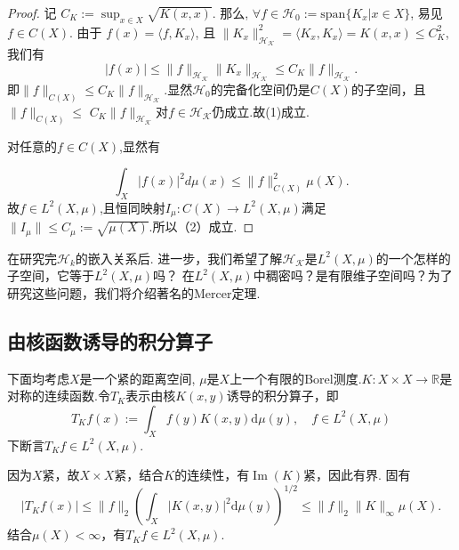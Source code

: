 \documentclass[12pt, a4paper, oneside]{ctexbook}
\begin{document}
\begin{proof}
    记 $C_K := \sup_{x \in X} \sqrt{K(x, x)}$. 那么, $\forall f \in \mathcal{H}_0 := \text{span}\{K_x | x \in X\}$, 易见 $f \in C(X)$. 由于 $f(x) = \langle f, K_x  \rangle$, 且 $\|K_x\|_{\mathcal{H_K}}^2 = \langle K_x, K_x \rangle = K(x, x) \leq C_K^2$, 我们有
$$|f(x)| \leq \|f\|_{\mathcal{H_K}} \|K_x\|_{\mathcal{H_K}} \leq C_K \|f\|_{\mathcal{H_K}}.$$
即$\|f\|_{C(X)}\leq C_K\|f\|_{\mathcal{H_K}}$.显然$\mathcal{H}_0$的完备化空间仍是$C(X)$的子空间，且$\|f\|_{C(X)}\leq$
$C_{K}\|f\|_{\mathcal{H_K}}$对$f\in\mathcal{H_K}$仍成立.故(1)成立.

对任意的$f\in C(X)$,显然有

$$\int_X|f(x)|^2d\mu(x)\leq\|f\|_{C(X)}^2\mu(X).$$
故$f\in L^2(X,\mu)$,且恒同映射$I_\mu:C(X)\to L^2(X,\mu)$满足$\|I_\mu\|\leq C_\mu:=\sqrt{\mu(X)}$.所以（2）成立.
\end{proof}

在研究完$\mathcal{H}_k$的嵌入关系后. 进一步，我们希望了解$\mathcal{H_K}$是$L^2(X,\mu)$的一个怎样的子空间，它等于$L^2(X,\mu)$吗？ 在$L^2(X,\mu)$中稠密吗？是有限维子空间吗？为了研究这些问题，我们将介绍著名的Mercer定理.

\subsection{由核函数诱导的积分算子}
下面均考虑$X$是一个紧的距离空间, $\mu$是$X$上一个有限的Borel测度.$K:X\times X\to\mathbb{R}$是对称的连续函数.令$T_K$表示由核$K(x,y)$诱导的积分算子，即
\begin{equation*}
    T_Kf(x):=\int_X f(y)K(x,y)\mathrm{d}\mu(y),\quad f\in L^2(X,\mu)
\end{equation*}
下断言$T_Kf\in L^2(X,\mu)$.

因为$X$紧，故$X\times X$紧，结合$K$的连续性，有$\operatorname{Im}(K)$紧，因此有界. 固有
\begin{equation*}
    \left|T_Kf(x)\right|\leq \|f\|_2\left(\int_X |K(x,y)|^2\mathrm{d}\mu(y)\right)^{1/2}\leq \|f\|_2\|K\|_\infty \mu(X).
\end{equation*}
结合$\mu(X)<\infty$，有$T_Kf\in L^2(X,\mu)$.
\end{document}

